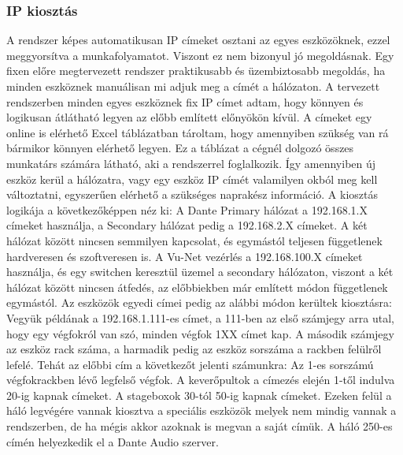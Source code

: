 \subsubsection{IP kiosztás}
A rendszer képes automatikusan IP címeket osztani az egyes eszközöknek,
ezzel meggyorsítva a munkafolyamatot. Viszont ez nem bizonyul jó megoldásnak.
Egy fixen előre megtervezett rendszer praktikusabb és
üzembiztosabb megoldás, ha minden eszköznek manuálisan mi adjuk meg a címét a
hálózaton. A tervezett rendszerben minden egyes eszköznek fix IP címet adtam,
hogy könnyen és logikusan átlátható legyen az előbb említett előnyökön kívül.
A címeket egy online is elérhető Excel táblázatban tároltam, hogy amennyiben szükség van rá
bármikor könnyen elérhető legyen. Ez a táblázat a cégnél dolgozó összes munkatárs számára látható,
aki a rendszerrel foglalkozik. Így amennyiben új eszköz kerül a hálózatra, vagy egy eszköz IP címét
valamilyen okból meg kell változtatni, egyszerűen elérhető a szükséges naprakész információ.
A kiosztás logikája a következőképpen néz ki:
A Dante Primary hálózat a 192.168.1.X címeket használja, a Secondary hálózat
pedig a 192.168.2.X címeket. A két hálózat között nincsen semmilyen kapcsolat, és egymástól teljesen függetlenek hardveresen és szoftveresen is.
A Vu-Net vezérlés a 192.168.100.X címeket használja, és egy switchen keresztül üzemel a secondary hálózaton, viszont a két hálózat között nincsen
átfedés, az előbbiekben már említett módon függetlenek egymástól.
Az eszközök egyedi címei pedig az alábbi módon kerültek kiosztásra:
Vegyük példának a 192.168.1.111-es címet, a 111-ben az első számjegy arra utal, hogy egy végfokról van szó, minden végfok
1XX címet kap. A második számjegy az eszköz rack száma, a harmadik pedig az eszköz sorszáma a rackben felülről lefelé.
Tehát az előbbi cím a következőt jelenti számunkra: Az 1-es sorszámú végfokrackben lévő legfelső végfok.
A keverőpultok a címezés elején 1-től indulva 20-ig kapnak címeket. A stageboxok 30-tól 50-ig kapnak címeket.
Ezeken felül a háló legvégére vannak kiosztva a speciális eszközök melyek nem mindig vannak a rendszerben, de ha mégis
akkor azoknak is megvan a saját címük.
A háló 250-es címén helyezkedik el a Dante Audio szerver.

